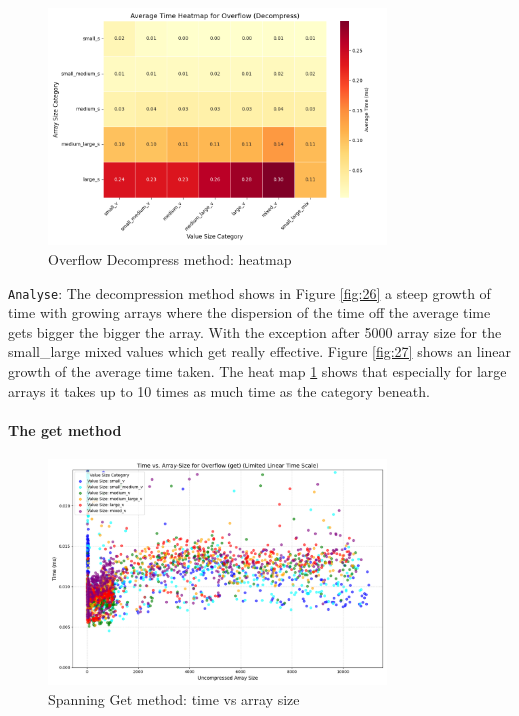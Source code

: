 \documentclass[11pt, a4paper]{article}
\begin{document}
	\begin{figure}[H]%
		\centering
		\includegraphics[width=0.8\textwidth]{Grafics/Overflow/OverflowDecompressHeat.png}
		\caption{Overflow Decompress method: heatmap}
		\label{fig:28}
	\end{figure}
	\texttt{Analyse}: The decompression method shows in Figure \ref{fig:26} a steep growth of time with growing arrays where the dispersion of the time off the average time gets bigger the bigger the array. With the exception after 5000 array size for the small\_large mixed values which get really effective. Figure \ref{fig:27} shows  an linear growth of the average time taken. The heat map \ref{fig:28} shows that especially for large arrays it takes up to 10 times as much time as the category beneath.
	
	\paragraph{The get method}
	\begin{figure}[H]%
		\centering
		\includegraphics[width=0.8\textwidth]{Grafics/Overflow/OverflowGetTimevsSize.png}
		\caption{Spanning Get method: time vs array size}
		\label{fig:29}
		
	\end{figure}
	
\end{document}
